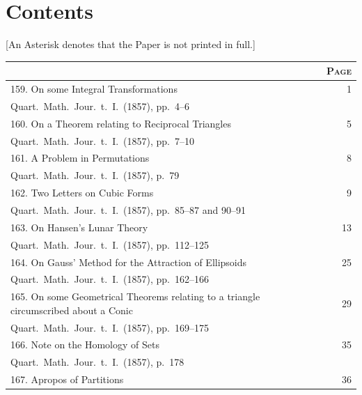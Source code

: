 \documentclass[12pt,a4paper]{article}
\theoremstyle{plain}
\begin{document}
\clearpage

\section*{Contents}

[An Asterisk denotes that the Paper is not printed in full.]

\begin{longtable}{p{}r}
\toprule
\multicolumn{1}{c}{} & \multicolumn{1}{c}{\textsc{Page}} \\
\midrule
\endhead
159. On some Integral Transformations \dotfill & 1 \\
\multicolumn{2}{l}{\small Quart.\ Math.\ Jour.\ t.~I.\ (1857), pp.~4--6} \\[0.5em]
%
160. On a Theorem relating to Reciprocal Triangles \dotfill & 5 \\
\multicolumn{2}{l}{\small Quart.\ Math.\ Jour.\ t.~I.\ (1857), pp.~7--10} \\[0.5em]
%
161. A Problem in Permutations \dotfill & 8 \\
\multicolumn{2}{l}{\small Quart.\ Math.\ Jour.\ t.~I.\ (1857), p.~79} \\[0.5em]
%
162. Two Letters on Cubic Forms \dotfill & 9 \\
\multicolumn{2}{l}{\small Quart.\ Math.\ Jour.\ t.~I.\ (1857), pp.~85--87 and 90--91} \\[0.5em]
%
163. On Hansen's Lunar Theory \dotfill & 13 \\
\multicolumn{2}{l}{\small Quart.\ Math.\ Jour.\ t.~I.\ (1857), pp.~112--125} \\[0.5em]
%
164. On Gauss' Method for the Attraction of Ellipsoids \dotfill & 25 \\
\multicolumn{2}{l}{\small Quart.\ Math.\ Jour.\ t.~I.\ (1857), pp.~162--166} \\[0.5em]
%
165. On some Geometrical Theorems relating to a triangle circumscribed about a Conic \dotfill & 29 \\
\multicolumn{2}{l}{\small Quart.\ Math.\ Jour.\ t.~I.\ (1857), pp.~169--175} \\[0.5em]
%
166. Note on the Homology of Sets \dotfill & 35 \\
\multicolumn{2}{l}{\small Quart.\ Math.\ Jour.\ t.~I.\ (1857), p.~178} \\[0.5em]
%
167. Apropos of Partitions \dotfill & 36 \\

\end{longtable}
\end{document}
